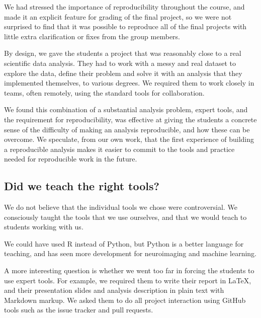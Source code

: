 We had stressed the importance of reproducibility throughout the course, and
made it an explicit feature for grading of the final project, so we were not
surprised to find that it was possible to reproduce all of the final projects
with little extra clarification or fixes from the group members.

By design, we gave the students a project that was reasonably close to a real
scientific data analysis.  They had to work with a messy and real dataset to
explore the data, define their problem and solve it with an analysis that they
implemented themselves, to various degrees.  We required them to work closely
in teams, often remotely, using the standard tools for collaboration.

We found this combination of a substantial analysis problem, expert tools, and
the requirement for reproducibility, was effective at giving the students a
concrete sense of the difficulty of making an analysis reproducible, and how
these can be overcome.  We speculate, from our own work, that the first
experience of building a reproducible analysis makes it easier to commit to
the tools and practice needed for reproducible work in the future.


\subsection{Did we teach the right tools?}

We do not believe that the individual tools we chose were controversial. We
consciously taught the tools that we use ourselves, and that we would teach to
students working with us.

We could have used R instead of Python, but Python is a better language for
teaching, and has seen more development for neuroimaging and machine learning.

A more interesting question is whether we went too far in forcing the students
to use expert tools.  For example, we required them to write their
report in \LaTeX, and their presentation slides and analysis description in
plain text with Markdown markup.  We asked them to do all project interaction
using GitHub tools such as the issue tracker and pull requests.

